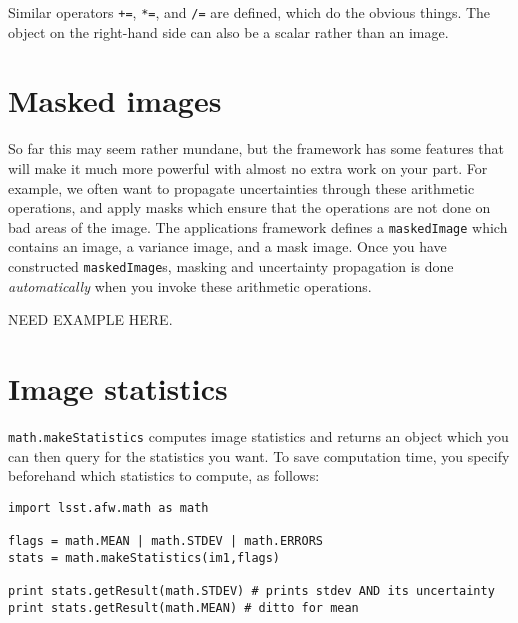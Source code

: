 \documentclass{book}
\begin{document}
Similar operators \texttt{+=}, \texttt{*=}, and \texttt{/=} are
defined, which do the obvious things.  The object on the right-hand
side can also be a scalar rather than an image.

\section{Masked images}

So far this may seem rather mundane, but the framework has some
features that will make it much more powerful with almost no extra
work on your part.  For example, we often want to propagate
uncertainties through these arithmetic operations, and apply masks
which ensure that the operations are not done on bad areas of the
image.  The applications framework defines a \texttt{maskedImage}
which contains an image, a variance image, and a mask image.
Once you have constructed \texttt{maskedImage}s, masking and
uncertainty propagation is done {\it automatically} when you invoke
these arithmetic operations.

NEED EXAMPLE HERE.

\section{Image statistics}

\texttt{math.makeStatistics} computes image statistics and returns an
object which you can then query for the statistics you want.  To save
computation time, you specify beforehand which statistics to compute,
as follows:

\begin{verbatim}
import lsst.afw.math as math

flags = math.MEAN | math.STDEV | math.ERRORS 
stats = math.makeStatistics(im1,flags)

print stats.getResult(math.STDEV) # prints stdev AND its uncertainty
print stats.getResult(math.MEAN) # ditto for mean

\end{verbatim}
\end{document}
